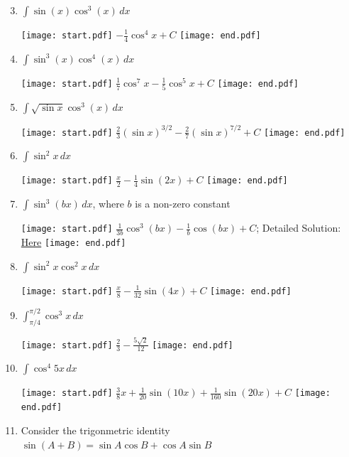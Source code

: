 \documentclass[12pt]{article}
\begin{document}
\begin{enumerate}
\setcounter{enumi}{2}

\item $\int \sin{(x)}\cos^3{(x)}\,dx$ 

\texttt{[image: start.pdf]}
{{$-\frac{1}{4}\cos^4{x}+C$}}
\texttt{[image: end.pdf]}


\item $\int \sin^3{(x)}\cos^4{(x)}\,dx$ 

\texttt{[image: start.pdf]}
{{$\frac{1}{7}\cos^7{x}-\frac{1}{5}\cos^5{x}+C$}}
\texttt{[image: end.pdf]}


\item $\int \sqrt{\sin{x}}\cos^{3}{(x)}\,dx$

\texttt{[image: start.pdf]}
{{$\frac{2}{3}(\sin{x})^{3/2}-\frac{2}{7}(\sin{x})^{7/2}+C$}}
\texttt{[image: end.pdf]}


\item $\int \sin^2{x} \,dx$ 

\texttt{[image: start.pdf]}
{{$\frac{x}{2}-\frac{1}{4}\sin{(2x)}+C$}}
\texttt{[image: end.pdf]}


\item $\int \sin^3{(bx)}\,dx$, where $b$ is a non-zero constant

\texttt{[image: start.pdf]}
{{$\frac{1}{3b}\cos^3{(bx)}-\frac{1}{b}\cos{(bx)}+C$; Detailed Solution: \textcolor{blue}{\href{http://www.math.drexel.edu/classes/Calculus/resources/Math122HW/Solutions/122_15_Trig_Int_07.pdf}{Here}}}}
\texttt{[image: end.pdf]}


\item $\int \sin^2{x}\cos^2{x}\,dx$ 

\texttt{[image: start.pdf]}
{{$\frac{x}{8}-\frac{1}{32}\sin{(4x)}+C$}}
\texttt{[image: end.pdf]}


\item $\int_{\pi/4}^{\pi/2} \cos^3{x}\,dx$ 

\texttt{[image: start.pdf]}
{{$\frac{2}{3}-\frac{5\sqrt{2}}{12}$}}
\texttt{[image: end.pdf]}


\item $\int \cos^4{5x}\,dx$

\texttt{[image: start.pdf]}
{{$\frac{3}{8}x+\frac{1}{20}\sin{(10x)}+\frac{1}{160}\sin{(20x)}+C$}}
\texttt{[image: end.pdf]}


\item Consider the trigonmetric identity $\sin{(A+B)}=\sin{A}\cos{B}+\cos{A}\sin{B}$

\begin{enumerate}


\end{enumerate}
\end{enumerate}
\end{document}

